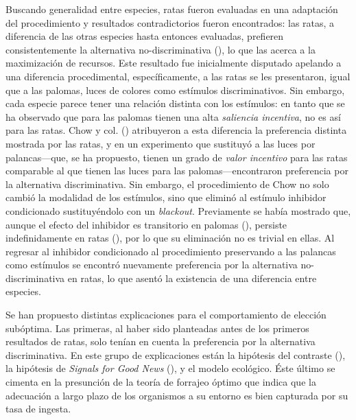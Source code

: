 \documentclass[a4paper,12pt]{article}
\begin{document}
Buscando generalidad entre especies, ratas fueron evaluadas en una adaptación del procedimiento y resultados contradictorios fueron encontrados: las ratas, a diferencia de las otras especies hasta entonces evaluadas, prefieren consistentemente la alternativa no-discriminativa (\cite{Trujano2015}), lo que las acerca a la maximización de recursos.
Este resultado fue inicialmente disputado apelando a una diferencia procedimental, específicamente, a las ratas se les presentaron, igual que a las palomas, luces de colores como estímulos discriminativos.
Sin embargo, cada especie parece tener una relación distinta con los estímulos: en tanto que se ha observado que para las palomas tienen una alta {\itshape saliencia incentiva}, no es así para las ratas. Chow y col. (\citeyear{Chow2017}) atribuyeron a esta diferencia la preferencia distinta mostrada por las ratas, y en un experimento que sustituyó a las luces por palancas---que, se ha propuesto, tienen un grado de {\itshape valor incentivo} para las ratas comparable al que tienen las luces para las palomas---encontraron preferencia por la alternativa discriminativa. Sin embargo, el procedimiento de Chow no solo cambió la modalidad de los estímulos, sino que eliminó al estímulo inhibidor condicionado sustituyéndolo con un {\itshape blackout}. Previamente se había mostrado que, aunque el efecto del inhibidor es transitorio en palomas (\cite{Laude2014a}), persiste indefinidamente en ratas (\cite{Trujano2016}), por lo que su eliminación no es trivial en ellas. Al regresar al inhibidor condicionado al procedimiento preservando a las palancas como estímulos se encontró nuevamente preferencia por la alternativa no-discriminativa en ratas, lo que asentó la existencia de una diferencia entre especies.

Se han propuesto distintas explicaciones para el comportamiento de elección subóptima. Las primeras, al haber sido planteadas antes de los primeros resultados de ratas, solo tenían en cuenta la preferencia por la alternativa discriminativa. En este grupo de explicaciones están la hipótesis del contraste (\cite{Zentall2016}), la hipótesis de {\itshape Signals for Good News} (\cite{McDevitt2016}), y el modelo ecológico. Éste último se cimenta en la presunción de la teoría de forrajeo óptimo que indica que la adecuación a largo plazo de los organismos a su entorno es bien capturada por su tasa de ingesta.



\end{document}
